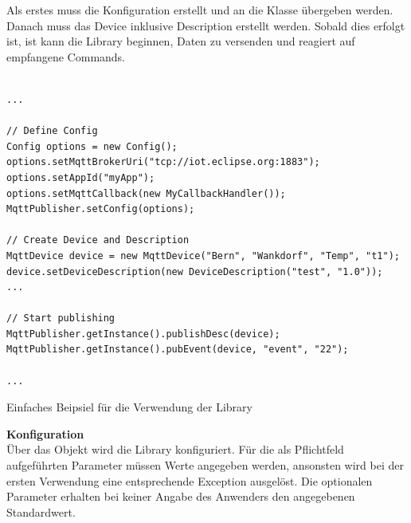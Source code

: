 Als erstes muss die Konfiguration erstellt und an die Klasse  übergeben werden. Danach muss das Device inklusive Description erstellt werden. Sobald dies erfolgt ist, ist kann die Library beginnen, Daten zu versenden und reagiert auf empfangene Commands.

\begin{listing}[H]
\begin{verbatim}

...

// Define Config
Config options = new Config();
options.setMqttBrokerUri("tcp://iot.eclipse.org:1883");
options.setAppId("myApp");
options.setMqttCallback(new MyCallbackHandler());
MqttPublisher.setConfig(options);
	
// Create Device and Description	
MqttDevice device = new MqttDevice("Bern", "Wankdorf", "Temp", "t1");	
device.setDeviceDescription(new DeviceDescription("test", "1.0"));
...

// Start publishing
MqttPublisher.getInstance().publishDesc(device);
MqttPublisher.getInstance().pubEvent(device, "event", "22");

...

\end{verbatim}
\caption{Einfaches Beipsiel für die Verwendung der Library}
\end{listing}

\textbf{Konfiguration} \\
Über das  Objekt wird die Library konfiguriert. Für die als Pflichtfeld aufgeführten Parameter müssen Werte angegeben werden, ansonsten wird bei der ersten Verwendung eine entsprechende Exception ausgelöst. Die optionalen Parameter erhalten bei keiner Angabe des Anwenders den angegebenen Standardwert.


